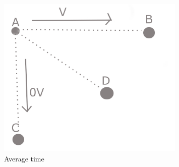 \documentclass{article}
\begin{document}
    \begin{figure}[h!]
        \centering
        \includegraphics[width=0.8\textwidth]{images/avarage-time-velocity}
        \caption{Average time}
        \label{fig:avarage time velocity}
    \end{figure}
\end{document}
